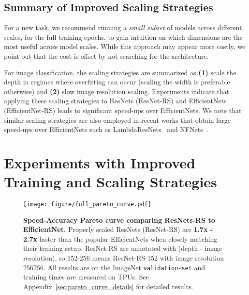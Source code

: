 \documentclass{article}
\begin{document}
\subsection{Summary of Improved Scaling Strategies}
For a new task, we recommend running a \emph{small subset} of models across different scales, for the full training epochs, to gain intuition on which dimensions are the most useful across model scales. 
While this approach may appear more costly, we point out that the cost is offset by not searching for the architecture.

For image classification, the scaling strategies are summarized as \textbf{(1)} scale the depth in regimes where overfitting can occur (scaling the width is preferable otherwise) and \textbf{(2)} slow image resolution scaling.
Experiments indicate that applying these scaling strategies to ResNets (ResNet-RS) and EfficientNets (EfficientNet-RS) leads to significant speed-ups over EfficientNets. 
We note that similar scaling strategies are also employed in recent works that obtain large speed-ups over EfficientNets such as LambdaResNets~\cite{bello2021lambdanetworks} and NFNets~\cite{brock2021highperformance}. \section{Experiments with Improved Training and Scaling Strategies}
\begin{figure}[t!]
    \begin{center}
    \texttt{[image: figure/full\_pareto\_curve.pdf]}
    \end{center}
    \vspace{-0.4cm}
    \caption{\textbf{Speed-Accuracy Pareto curve comparing ResNets-RS to EfficientNet.} 
    Properly scaled ResNets (ResNet-RS) are \textbf{1.7x - 2.7x} faster than the popular EfficientNets when closely matching their training setup. 
    ResNet-RS are annotated with (depth - image resolution), so 152-256 means ResNet-RS-152 with image resolution 256256. 
    All results are on the ImageNet \texttt{validation-set} and training times are measured on TPUs.
    See Appendix~\ref{sec:pareto_curve_details} for detailed results.}
    \label{fig:pareto_curve_inference}
    \vspace{-0.1cm}
\end{figure}
\end{document}
